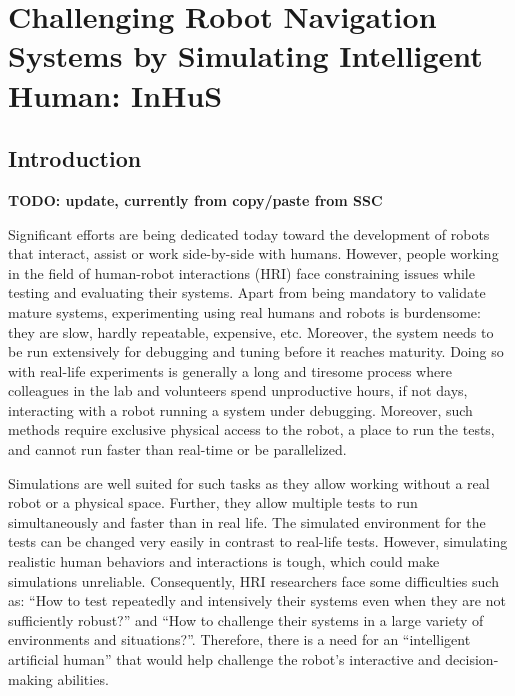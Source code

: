 \ifdefined{}
\else
\setcounter{chapter}{6} %
\dominitoc
\faketableofcontents
\fi

\chapter{Challenging Robot Navigation Systems by Simulating Intelligent Human: InHuS}
\label{chap:7}
\minitoc

\section{Introduction}

\textbf{TODO: update, currently from copy/paste from SSC}

Significant efforts are being dedicated today toward the development of robots that interact, assist or work side-by-side with humans. However, people working in the field of human-robot interactions (HRI) face constraining issues while testing and evaluating their systems. 
Apart from being mandatory to validate mature systems, experimenting using real humans and robots is burdensome: they are slow, hardly repeatable, expensive, etc. Moreover, the system needs to be run extensively for debugging and tuning before it reaches maturity. Doing so with real-life experiments is generally a long and tiresome process where colleagues in the lab and volunteers spend unproductive hours, if not days, interacting with a robot running a system under debugging. Moreover, such methods require exclusive physical access to the robot, a place to run the tests, and cannot run faster than real-time or be parallelized.

Simulations are well suited for such tasks as they allow working without a real robot or a physical space. Further, they allow multiple tests to run simultaneously and faster than in real life. The simulated environment for the tests can be changed very easily in contrast to real-life tests. However, simulating realistic human behaviors and interactions is tough, which could make simulations unreliable. Consequently, HRI researchers face some difficulties such as: ``How to test repeatedly and intensively their systems even when they are not sufficiently robust?'' and ``How to challenge their systems in a large variety of environments and situations?''. Therefore, there is a need for an ``intelligent artificial human'' that would help challenge the robot's interactive and decision-making abilities. 


